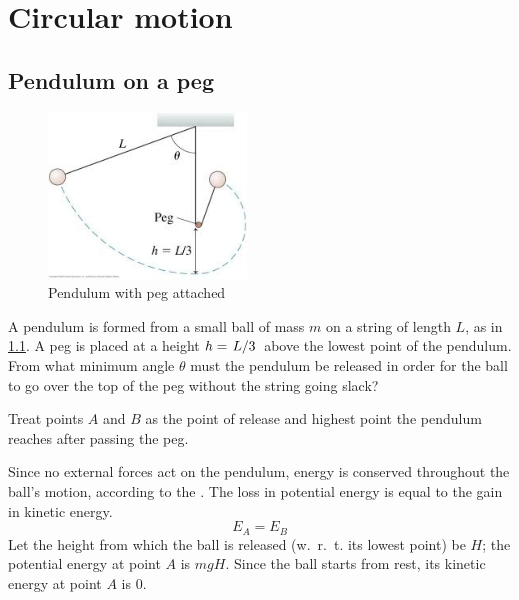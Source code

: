 \chapter{Circular motion}

\section{Pendulum on a peg}
\begin{figure}
  \centering
  \includegraphics[width=0.47\textwidth]{assets/balpeg.png}
  \caption{Pendulum with peg attached}
  \label{fig:balpeg}
\end{figure}
\begin{problem}
  A pendulum is formed from a small ball of mass \(m\) on a string of
  length \(L\), as in \cref{fig:balpeg}. A peg is placed at a height
  \(h = \lf{L}{3}\) above the lowest point of the pendulum. From what
  minimum angle \(\theta\) must the pendulum be released in order for
  the ball to go over the top of the peg without the string going slack?
\end{problem}

Treat points \(A\) and \(B\) as the point of release
and highest point the pendulum reaches after passing the peg.

Since no external forces act on the pendulum, energy is conserved
throughout the ball's motion, according to the . The loss in potential energy is equal to the
gain in kinetic energy.
\begin{equation*}
  E_A = E_B
\end{equation*}
Let the height from which the ball is released (w.~r.~t. its lowest
point) be \(H\); the potential energy at point \(A\) is \(mgH\).
Since the ball starts from rest, its kinetic energy at point \(A\) is \(0\).

